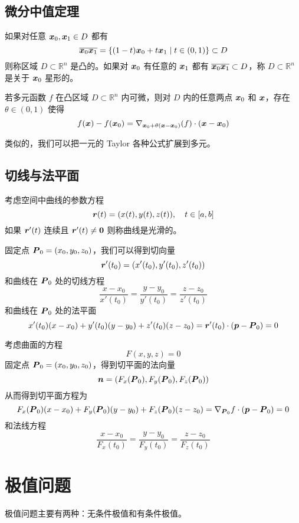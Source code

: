 \subsection{微分中值定理}

如果对任意 $\boldsymbol{x}_0, \boldsymbol{x}_1 \in D$ 都有
\[ \overline{\boldsymbol{x}_0 \boldsymbol{x}_1} = \{ (1-t)\boldsymbol{x}_0 + t\boldsymbol{x}_1 \mid t \in (0, 1) \} \subset D \]
则称区域 $D \subset \mathbb{R}^n$ 是凸的。如果对 $\boldsymbol{x}_0$ 有任意的 $\boldsymbol{x}_1$ 都有 $\overline{\boldsymbol{x}_0 \boldsymbol{x}_1} \subset D$，称 $D \subset \mathbb{R}^n$ 是关于 $\boldsymbol{x}_0$ 星形的。

\begin{theorem}
	若多元函数 $f$ 在凸区域 $D \subset \mathbb{R}^n$ 内可微，则对 $D$ 内的任意两点 $\boldsymbol{x}_0$ 和 $\boldsymbol{x}$，存在 $\theta \in (0, 1)$ 使得
	\[ f(\boldsymbol{x}) - f(\boldsymbol{x}_0) = \nabla_{\boldsymbol{x}_0 + \theta(\boldsymbol{x} - \boldsymbol{x}_0)}(f) \cdot (\boldsymbol{x} - \boldsymbol{x}_0) \]
\end{theorem}

类似的，我们可以把一元的 Taylor 各种公式扩展到多元。

\subsection{切线与法平面}

考虑空间中曲线的参数方程
\[ \boldsymbol{r}(t) = (x(t), y(t), z(t)), \quad t \in [a, b] \]
如果 $\boldsymbol{r}'(t)$ 连续且 $\boldsymbol{r}'(t) \neq \boldsymbol{0}$ 则称曲线是光滑的。

固定点 $\boldsymbol{P}_0 = (x_0, y_0, z_0)$，我们可以得到切向量
\[ \boldsymbol{r}'(t_0) = (x'(t_0), y'(t_0), z'(t_0)) \]
和曲线在 $\boldsymbol{P}_0$ 处的切线方程
\[ \frac{x - x_0}{x'(t_0)} = \frac{y - y_0}{y'(t_0)} = \frac{z - z_0}{z'(t_0)} \]
和曲线在 $\boldsymbol{P}_0$ 处的法平面
\[ x'(t_0)(x - x_0) + y'(t_0)(y - y_0) + z'(t_0)(z - z_0) = \boldsymbol{r}'(t_0) \cdot (\boldsymbol{p} - \boldsymbol{P}_0) = 0 \]

考虑曲面的方程
\[ F(x, y, z) = 0 \]
固定点 $\boldsymbol{P}_0 = (x_0, y_0, z_0)$，得到切平面的法向量
\[ \boldsymbol{n} = (F_x(\boldsymbol{P}_0), F_y(\boldsymbol{P}_0), F_z(\boldsymbol{P}_0)) \]
从而得到切平面方程为
\[ F_x(\boldsymbol{P}_0)(x-x_0) + F_y(\boldsymbol{P}_0)(y-y_0) + F_z(\boldsymbol{P}_0)(z-z_0) = \nabla_{\boldsymbol{P}_0}f \cdot (\boldsymbol{p} - \boldsymbol{P}_0) = 0 \]
和法线方程
\[ \frac{x - x_0}{F_x(t_0)} = \frac{y - y_0}{F_y(t_0)} = \frac{z - z_0}{F_z(t_0)} \]

\section{极值问题}

极值问题主要有两种：无条件极值和有条件极值。

